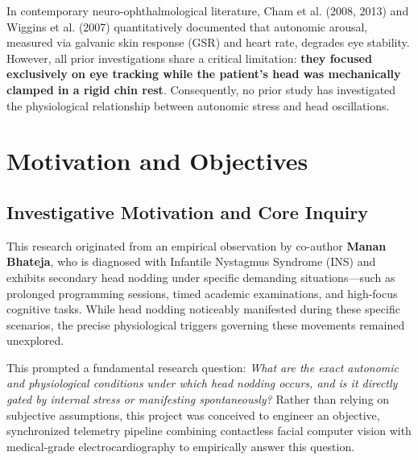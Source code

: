 \documentclass[12pt,a4paper,oneside]{report}
\begin{document}
In contemporary neuro-ophthalmological literature, Cham et al. (2008, 2013) \cite{cham2008, cham2013} and Wiggins et al. (2007) \cite{wiggins2007} quantitatively documented that autonomic arousal, measured via galvanic skin response (GSR) and heart rate, degrades eye stability. However, all prior investigations share a critical limitation: \textbf{they focused exclusively on eye tracking while the patient's head was mechanically clamped in a rigid chin rest}. Consequently, no prior study has investigated the physiological relationship between autonomic stress and head oscillations.

\chapter{Motivation and Objectives}
\label{chap:motivation}

\section{Investigative Motivation and Core Inquiry}
This research originated from an empirical observation by co-author \textbf{Manan Bhateja}, who is diagnosed with Infantile Nystagmus Syndrome (INS) and exhibits secondary head nodding under specific demanding situations---such as prolonged programming sessions, timed academic examinations, and high-focus cognitive tasks. While head nodding noticeably manifested during these specific scenarios, the precise physiological triggers governing these movements remained unexplored.

This prompted a fundamental research question: \textit{What are the exact autonomic and physiological conditions under which head nodding occurs, and is it directly gated by internal stress or manifesting spontaneously?} Rather than relying on subjective assumptions, this project was conceived to engineer an objective, synchronized telemetry pipeline combining contactless facial computer vision with medical-grade electrocardiography to empirically answer this question.
\end{document}
